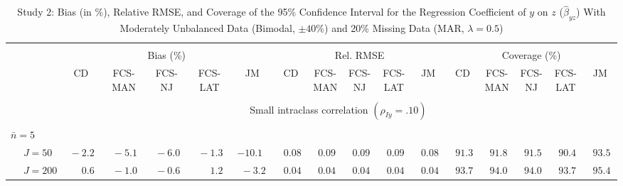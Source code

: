 \begin{sidewaystable}
\begin{threeparttable}
\setlength{\tabcolsep}{1.0pt}
\renewcommand{\arraystretch}{0.95}
\footnotesize
\caption{\small Study 2: Bias (in \%), Relative RMSE, and Coverage of the 95\% Confidence Interval for the Regression Coefficient of $y$ on $z$ ($\hat\beta_{yz}$) With Moderately Unbalanced Data (Bimodal, $\pm 40\%$) and 20\% Missing Data (MAR, $\lambda=0.5$)}
\begin{tabular}{llccccccccccccccc}
\hline\\[-1.8ex]
& & \multicolumn{5}{c}{Bias (\%)} & \multicolumn{5}{c}{Rel. RMSE} & \multicolumn{5}{c}{Coverage (\%)} \\ \cmidrule(r){3-7}\cmidrule(r){8-12}\cmidrule(r){13-17}
 &  & CD & \makecell{FCS-\\MAN} & \makecell{FCS-\\NJ} & \makecell{FCS-\\LAT} & JM & CD & \makecell{FCS-\\MAN} & \makecell{FCS-\\NJ} & \makecell{FCS-\\LAT} & JM & CD & \makecell{FCS-\\MAN} & \makecell{FCS-\\NJ} & \makecell{FCS-\\LAT} & \multicolumn{1}{c}{JM} \\ 
[0.4ex]\hline\\[-1.8ex]
& & \multicolumn{15}{c}{Small intraclass correlation $(\rho_{Iy}=.10)$} \\[0.6ex]\hline\\[-1.8ex]
\multicolumn{4}{l}{$\bar{n}=5$} \\  & \nopagebreak $\;J=50$  & $\phantom{0}{-}2.2\phantom{0}$ & $\phantom{0}{-}5.1\phantom{0}$ & $\phantom{0}{-}6.0\phantom{0}$ & $\phantom{0}{-}1.3\phantom{0}$ & ${-}10.1\phantom{0}$ & $\phantom{0}0.08\phantom{0}$ & $\phantom{0}0.09\phantom{0}$ & $\phantom{0}0.09\phantom{0}$ & $\phantom{0}0.09\phantom{0}$ & $\phantom{0}0.08\phantom{0}$ & $\phantom{0}91.3\phantom{0}$ & $\phantom{0}91.8\phantom{0}$ & $\phantom{0}91.5\phantom{0}$ & $\phantom{0}90.4\phantom{0}$ & $\phantom{0}93.5\phantom{0}$ \\
 & \nopagebreak $\;J=200$  & $\phantom{0}\phantom{-}0.6\phantom{0}$ & $\phantom{0}{-}1.0\phantom{0}$ & $\phantom{0}{-}0.6\phantom{0}$ & $\phantom{0}\phantom{-}1.2\phantom{0}$ & $\phantom{0}{-}3.2\phantom{0}$ & $\phantom{0}0.04\phantom{0}$ & $\phantom{0}0.04\phantom{0}$ & $\phantom{0}0.04\phantom{0}$ & $\phantom{0}0.04\phantom{0}$ & $\phantom{0}0.04\phantom{0}$ & $\phantom{0}93.7\phantom{0}$ & $\phantom{0}94.0\phantom{0}$ & $\phantom{0}94.0\phantom{0}$ & $\phantom{0}93.7\phantom{0}$ & $\phantom{0}95.4\phantom{0}$ \\

\end{tabular}
\end{threeparttable}
\end{sidewaystable}
